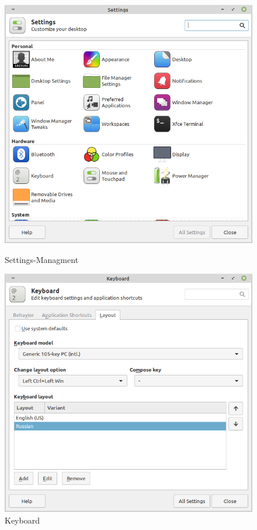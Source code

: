 \begin{figure}[!htp]
    \begin{minipage}{0.49\textwidth}
        \centering
        \includegraphics[width=\linewidth]
            {../input/task-2/3/Settings-Managment.png}
        \caption{Settings-Managment}
        \label{fig:Settings-Managment}
    \end{minipage}
    \begin{minipage}{0.49\textwidth}
        \centering
        \includegraphics[width=\linewidth]
            {../input/task-2/3/Keyboard.png}
        \caption{Keyboard}
        \label{fig:Keyboard}
    \end{minipage}
\end{figure}

